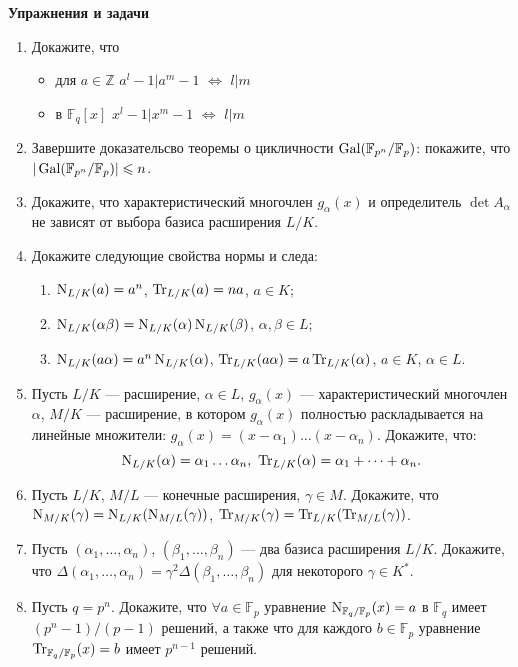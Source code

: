 \noindent\textbf{Упражнения и задачи}

\begin{enumerate}[topsep=0pt]
    \item Докажите, что
    \begin{itemize}[noitemsep,topsep=0pt]
        \item для $a\in\mathbb{Z}$ $a^l-1|a^m-1$ $\Leftrightarrow$ $l|m$
        \item в $\mathbb{F}_q[x]$ $x^l-1|x^m-1$ $\Leftrightarrow$ $l|m$
    \end{itemize}
    \item Завершите доказательсво теоремы о цикличности $\operatorname{Gal}(\mathbb{F}_{p^n}/\mathbb{F}_p)$: покажите, что $|\operatorname{Gal}(\mathbb{F}_{p^n}/\mathbb{F}_p)| \leqslant n$.
    \item Докажите, что характеристический многочлен $g_\alpha(x)$ и определитель $\det A_\alpha$ не зависят от выбора базиса расширения $L/K$.
    \item Докажите следующие свойства нормы и следа:
    \begin{enumerate}[noitemsep,topsep=0pt]
        \item $\operatorname{N}_{L/K}(a)=a^n$, $\operatorname{Tr}_{L/K}(a)=na$, $a\in K$;
        \item $\operatorname{N}_{L/K}(\alpha\beta)=\operatorname{N}_{L/K}(\alpha)\operatorname{N}_{L/K}(\beta)$, $\alpha, \beta \in L$;
        \item $\operatorname{N}_{L/K}(a\alpha)=a^n\operatorname{N}_{L/K}(\alpha)$, $\operatorname{Tr}_{L/K}(a\alpha)=a\operatorname{Tr}_{L/K}(\alpha)$, $a\in K$, $\alpha \in L$.
    \end{enumerate}
    \item Пусть $L/K$ --- расширение, $\alpha \in L$, $g_\alpha(x)$ --- характеристический многочлен $\alpha$, $M/K$ --- расширение, в котором $g_\alpha(x)$ полностью раскладывается на линейные множители: $g_\alpha(x) = (x-\alpha_1)\dots(x-\alpha_n)$. Докажите, что:
    $$
        \N_{L/K}(\alpha)=\alpha_1\dots \alpha_n,\ \Tr_{L/K}(\alpha) = \alpha_1 + \dots + \alpha_n.
    $$
    \item Пусть $L/K$, $M/L$ --- конечные расширения, $\gamma\in M$. Докажите, что $\operatorname{N}_{M/K}(\gamma)=\operatorname{N}_{L/K}(\operatorname{N}_{M/L}(\gamma))$, $\operatorname{Tr}_{M/K}(\gamma)=\operatorname{Tr}_{L/K}(\operatorname{Tr}_{M/L}(\gamma))$.
    \item Пусть $(\alpha_1, \dots, \alpha_n)$, $(\beta_1, \dots, \beta_n)$ --- два базиса расширения $L/K$. Докажите, что $\Delta(\alpha_1, \dots, \alpha_n)=\gamma^2\Delta(\beta_1, \dots, \beta_n)$ для некоторого $\gamma\in K^*$.
    \item Пусть $q=p^n$. Докажите, что $\forall a\in\mathbb{F}_p$ уравнение $\operatorname{N}_{\mathbb{F}_q/\mathbb{F}_p} (x) = a$ в $\mathbb{F}_q$ имеет $(p^n-1)/(p-1)$ решений, а также что для каждого $b\in\mathbb{F}_p$  уравнение $\operatorname{Tr}_{\mathbb{F}_q/\mathbb{F}_p} (x) = b$ имеет $p^{n-1}$ решений. %

\end{enumerate}
